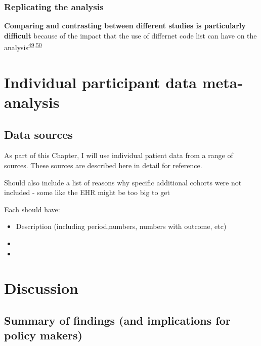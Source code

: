 \documentclass[a4paper, twoside]{templates/ociamthesis}
\begin{document}
\hypertarget{replicating-the-analysis}{%
\subsection{Replicating the analysis}\label{replicating-the-analysis}}

\textbf{Comparing and contrasting between different studies is particularly difficult} because of the impact that the use of differnet code list can have on the analysis\textsuperscript{\protect\hyperlink{ref-wilkinson2018a}{49},\protect\hyperlink{ref-mcguinness2019c}{50}}



\hypertarget{ipd-heading}{%
\chapter{Individual participant data meta-analysis}\label{ipd-heading}}

\minitoc 

\hypertarget{data-sources}{%
\section{Data sources}\label{data-sources}}

As part of this Chapter, I will use individual patient data from a range of sources. These sources are described here in detail for reference.

Should also include a list of reasons why specific additional cohorts were not included - some like the EHR might be too big to get

Each should have:

\begin{itemize}
\item
  Description (including period,numbers, numbers with outcome, etc)
\item
\item
\end{itemize}

\hypertarget{discussion-2}{%
\chapter{Discussion}\label{discussion-2}}

\hypertarget{summary-of-findings-and-implications-for-policy-makers}{%
\section{Summary of findings (and implications for policy makers)}\label{summary-of-findings-and-implications-for-policy-makers}}
\end{document}
